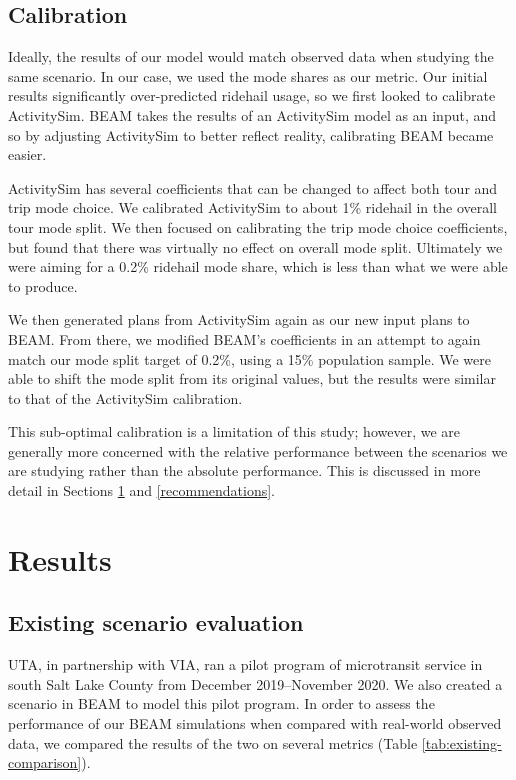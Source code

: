 \documentclass[
]{article}
\begin{document}
\hypertarget{scenario-calibration}{%
\subsection{Calibration}\label{scenario-calibration}}

Ideally, the results of our model would match observed data when studying the same scenario. In our case, we used the mode shares as our metric. Our initial results significantly over-predicted ridehail usage, so we first looked to calibrate ActivitySim. BEAM takes the results of an ActivitySim model as an input, and so by adjusting ActivitySim to better reflect reality, calibrating BEAM became easier.

ActivitySim has several coefficients that can be changed to affect both tour and trip mode choice. We calibrated ActivitySim to about 1\% ridehail in the overall tour mode split. We then focused on calibrating the trip mode choice coefficients, but found that there was virtually no effect on overall mode split. Ultimately we were aiming for a 0.2\% ridehail mode share, which is less than what we were able to produce.

We then generated plans from ActivitySim again as our new input plans to BEAM. From there, we modified BEAM's coefficients in an attempt to again match our mode split target of 0.2\%, using a 15\% population sample. We were able to shift the mode split from its original values, but the results were similar to that of the ActivitySim calibration.

This sub-optimal calibration is a limitation of this study; however, we are generally more concerned with the relative performance between the scenarios we are studying rather than the absolute performance. This is discussed in more detail in Sections \ref{results} and \ref{recommendations}.

\hypertarget{results}{%
\section{Results}\label{results}}

\hypertarget{existing-scenario-evaluation}{%
\subsection{Existing scenario evaluation}\label{existing-scenario-evaluation}}

UTA, in partnership with VIA, ran a pilot program of microtransit service in south Salt Lake County from December 2019--November 2020. We also created a scenario in BEAM to model this pilot program. In order to assess the performance of our BEAM simulations when compared with real-world observed data, we compared the results of the two on several metrics (Table \ref{tab:existing-comparison}).
\end{document}
